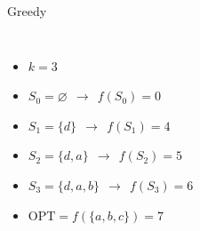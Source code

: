 \documentclass[xetex,10pt,mathserif]{beamer}
\begin{document}
\begin{frame}{Greedy}
\begin{columns}[c]
\begin{itemize}
\item<1-> $k = 3$
\vspace{1em}
\item<2-> $S_0 = \varnothing\ \ \longrightarrow\ \ f(S_0) = 0$
\vspace{1em}
\item<3-> $S_1 = \{d\}\ \ \longrightarrow\ \ f(S_1) = 4$
\vspace{1em}
\item<4-> $S_2 = \{d, a\}\ \ \longrightarrow\ \ f(S_2) = 5$
\vspace{1em}
\item<5-> $S_3 = \{d, a, b\}\ \ \longrightarrow\ \ f(S_3) = 6$
\vspace{1em}
\item<6-> $\textrm{OPT} = f(\{a, b, c\}) = 7$
\end{itemize}
\centering
{}
\end{columns}
\end{frame}
\end{document}
